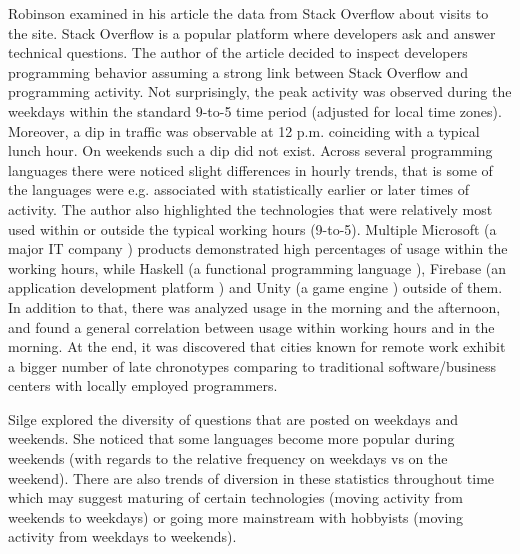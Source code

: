 
Robinson \cite{Rob17LangsUsedAtNight} examined in his article the data from Stack Overflow about visits to the site. Stack Overflow \cite{Sta22StackOverflow} is a popular platform where developers ask and answer technical questions. The author of the article decided to inspect developers programming behavior assuming a strong link between Stack Overflow and programming activity. Not surprisingly, the peak activity was observed during the weekdays within the standard 9-to-5 time period (adjusted for local time zones). Moreover, a dip in traffic was observable at 12 p.m. coinciding with a typical lunch hour. On weekends such a dip did not exist. Across several programming languages there were noticed slight differences in hourly trends, that is some of the languages were e.g. associated with statistically earlier or later times of activity. The author also highlighted the technologies that were relatively most used within or outside the typical working hours (9-to-5). Multiple Microsoft (a major IT company \cite{Microsoft}) products demonstrated high percentages of usage within the working hours, while Haskell (a functional programming language \cite{Haskell}), Firebase (an application development platform \cite{Firebase}) and Unity (a game engine \cite{Unity}) outside of them. In addition to that, there was analyzed usage in the morning and the afternoon, and found a general correlation between usage within working hours and in the morning. At the end, it was discovered that cities known for remote work exhibit a bigger number of late chronotypes comparing to traditional software/business centers with locally employed programmers.

Silge \cite{Sil17LangsUsedOnWeekends} explored the diversity of questions that are posted on weekdays and weekends. She noticed that some languages become more popular during weekends (with regards to the relative frequency on weekdays vs on the weekend). There are also trends of diversion in these statistics throughout time which may suggest maturing of certain technologies (moving activity from weekends to weekdays) or going more mainstream with hobbyists (moving activity from weekdays to weekends).
